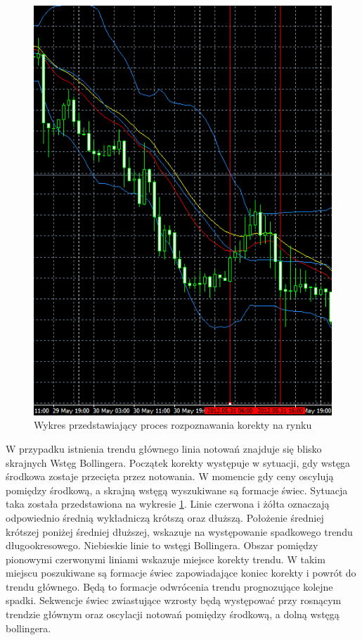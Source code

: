 \documentclass[pdflatex,11pt]{aghdpl}
\begin{document}
\begin{figure}[h!]
\begin{center}
\includegraphics[width=12cm]{trend.png}
\caption{Wykres przedstawiający proces rozpoznawania korekty na rynku}
\label{trend}
\end{center}
\end{figure} 

W przypadku istnienia trendu głównego linia notowań znajduje się blisko skrajnych Wstęg Bollingera. Początek korekty występuje w sytuacji, gdy wstęga środkowa zostaje przecięta przez notowania. W momencie gdy ceny oscylują pomiędzy środkową, a skrajną wstęgą wyszukiwane są formacje świec. Sytuacja taka została przedstawiona na wykresie \ref{trend}. Linie czerwona i żółta oznaczają odpowiednio średnią wykładniczą krótszą oraz dłuższą. Położenie średniej krótszej poniżej średniej dłuższej, wskazuje na występowanie spadkowego trendu długookresowego. Niebieskie linie to wstęgi Bollingera. Obszar pomiędzy pionowymi czerwonymi liniami wskazuje miejsce korekty trendu. W takim miejscu poszukiwane są formacje świec zapowiadające koniec korekty i powrót do trendu głównego. Będą to formacje odwrócenia trendu prognozujące kolejne spadki. Sekwencje świec zwiastujące wzrosty będą występować przy rosnącym trendzie głównym oraz oscylacji notowań pomiędzy środkową, a dolną wstęgą bollingera.  
\end{document}
